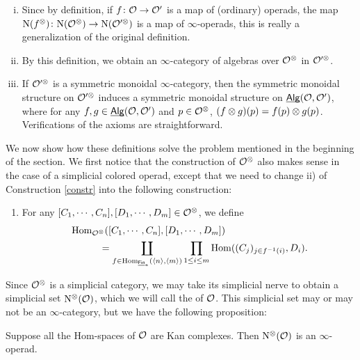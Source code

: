 \documentclass[twoside]{article}
\begin{document}
\begin{remark}\label{a}
    \begin{enumerate}[i)]
        \item Since by definition, if $f\:\cal O\to O'$ is a map of (ordinary) operads,
        the map $\N(f^\ox)\:\N(\cal O^\ox)\to\N(O'^\ox)$ is a map of $\infty$-operads,
        this is really a generalization of the original definition.

        \item By this definition, we obtain an $\infty$-category of algebras
        over $\cal O^\ox$ in $\cal O'^\ox$.

        \item If $\cal O'^\ox$ is a symmetric monoidal $\infty$-category,
        then the symmetric monoidal structure on $\cal O'^\ox$ induces a 
        symmetric monoidal structure on $\Alg(\cal O,\cal O')$, where for any 
        $f,g\in\Alg(\cal O,\cal O')$ and $p\in\cal O^\ox$, $(f\ox g)(p)=f(p)\ox g(p)$.
        Verifications of the axioms are straightforward.
    \end{enumerate}
\end{remark}

We now show how these definitions solve the problem mentioned in the beginning of
the section. We first notice that the construction of $\cal O^\ox$ also makes
sense in the case of a simplicial colored operad, except that we need to
change ii) of Construction \ref{constr} into the following construction:

\begin{enumerate}[ii')]
\item For any $[C_1,\cdots,C_n],[D_1,\cdots,D_m]\in\cal O^\ox$, we define
\[\begin{aligned}&\Hom_{\cal O^\ox}([C_1,\cdots,C_n],[D_1,\cdots,D_m])\\
&\hspace{3em}=\coprod_{f\in\Hom_{\Fin_*}(\<n\>,\<m\>)}\prod_{1\le i\le m}
\Hom((C_j)_{j\in f^{-1}(i)},D_i).\end{aligned}\]
\end{enumerate}

Since $\cal O^\ox$ is a simplicial category, we may take its simplicial nerve
to obtain a simplicial set $\N^\ox(\cal O)$, which we will call 
the  of $\cal O$. This simplicial set may or may not be an
$\infty$-category, but we have the following proposition:

\begin{proposition}\label{d}
Suppose all the Hom-spaces of $\cal O$ are Kan complexes. Then $\N^\ox(\cal O)$
is an $\infty$-operad.
\end{proposition}
\end{document}
